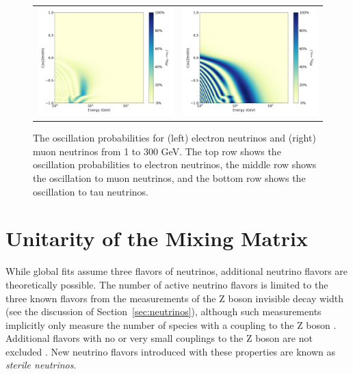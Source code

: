\begin{figure}
\begin{tabular}{cc}
    \includegraphics[width=0.48\linewidth]{prob3_nue_nutau.png} &  
    \includegraphics[width=0.48\linewidth]{prob3_numu_nutau.png} \\ 
\end{tabular}
\caption[Oscillation probabilities between 1 and 300 GeV]{The oscillation probabilities for (left) electron neutrinos and (right) muon neutrinos from 1 to 300 GeV. The top row shows the oscillation probabilities to electron neutrinos, the middle row shows the oscillation to muon neutrinos, and the bottom row shows the oscillation to tau neutrinos. }
\label{fig:oscil_probs}
\end{figure}










\section{Unitarity of the Mixing Matrix}
\label{sec:unitarity}
While global fits assume three flavors of neutrinos, additional neutrino flavors are theoretically possible.
The number of active neutrino flavors is limited to the three known flavors from the measurements of the Z boson invisible decay width (see the discussion of Section~\ref{sec:neutrinos}), although such measurements implicitly only measure the number of species with a coupling to the Z boson \cite{ALEPH-3Nu}.
Additional flavors with no or very small couplings to the Z boson are not excluded \cite{Review-LightSterile}.
New neutrino flavors introduced with these properties are known as \emph{sterile neutrinos}.

